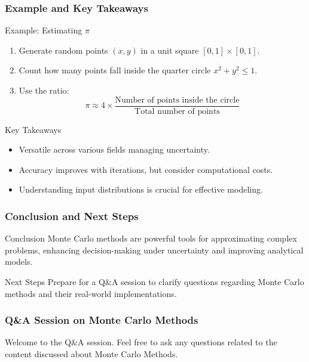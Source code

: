 \documentclass[aspectratio=169]{beamer}
\begin{document}
\begin{frame}[fragile]
    \frametitle{Example and Key Takeaways}
    \begin{block}{Example: Estimating $\pi$}
        \begin{enumerate}
            \item Generate random points \((x, y)\) in a unit square \([0, 1] \times [0, 1]\).
            \item Count how many points fall inside the quarter circle \(x^2 + y^2 \leq 1\).
            \item Use the ratio:
            \begin{equation}
            \pi \approx 4 \times \frac{\text{Number of points inside the circle}}{\text{Total number of points}}
            \end{equation}
        \end{enumerate}
    \end{block}

    \begin{block}{Key Takeaways}
        \begin{itemize}
            \item Versatile across various fields managing uncertainty.
            \item Accuracy improves with iterations, but consider computational costs.
            \item Understanding input distributions is crucial for effective modeling.
        \end{itemize}
    \end{block}
\end{frame}

\begin{frame}[fragile]
    \frametitle{Conclusion and Next Steps}
    \begin{block}{Conclusion}
        Monte Carlo methods are powerful tools for approximating complex problems, enhancing decision-making under uncertainty and improving analytical models.
    \end{block}

    \begin{block}{Next Steps}
        Prepare for a Q\&A session to clarify questions regarding Monte Carlo methods and their real-world implementations.
    \end{block}
\end{frame}

\begin{frame}[fragile]
    \frametitle{Q\&A Session on Monte Carlo Methods}
    Welcome to the Q\&A session. Feel free to ask any questions related to the content discussed about Monte Carlo Methods.
\end{frame}
\end{document}

